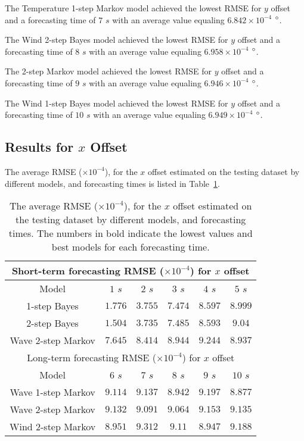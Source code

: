\documentclass[preprint,12pt]{elsarticle}
\begin{document}
The Temperature 1-step Markov model achieved the lowest RMSE for $y$ offset and a forecasting time of $7$ $s$ with an average value equaling $6.842 \times 10^{-4}$ $\degree$.

The Wind 2-step Bayes model achieved the lowest RMSE for $y$ offset and a forecasting time of $8$ $s$ with an average value equaling $6.958 \times 10^{-4}$ $\degree$.

The 2-step Markov model achieved the lowest RMSE for $y$ offset and a forecasting time of $9$ $s$ with an average value equaling $6.946 \times 10^{-4}$ $\degree$.

The Wind 1-step Bayes model achieved the lowest RMSE for $y$ offset and a forecasting time of $10$ $s$ with an average value equaling $6.949 \times 10^{-4}$ $\degree$.

\subsection{Results for $x$ Offset}

The average RMSE ($\times 10^{-4}$), for the $x$ offset estimated on the testing dataset by different models, and forecasting times is listed in Table~\ref{tab:best_longitude_RMSE}.

\begin{table}[!ht]
	\centering
	\begin{tabular}{|c|c|c|c|c|c|}
		\hline
		\multicolumn{6}{|c|}{Short-term forecasting RMSE ($\times 10^{-4}$) for $x$ offset} \\ \hline
		Model & $1$ $s$ & $2$ $s$ & $3$ $s$ & $4$ $s$ & $5$ $s$ \\ \hline
		1-step Bayes & $1.776$ & $3.755$ & $\mathbf{7.474}$ & $8.597$ & $8.999$ \\ \hline
		2-step Bayes & $\mathbf{1.504}$ & $\mathbf{3.735}$ & $7.485$ & $\mathbf{8.593}$ & $9.04$ \\ \hline
		Wave 2-step Markov & $7.645$ & $8.414$ & $8.944$ & $9.244$ & $\mathbf{8.937}$ \\ \hline
		\multicolumn{6}{|c|}{Long-term forecasting RMSE ($\times 10^{-4}$) for $x$ offset} \\ \hline
		Model & $6$ $s$ & $7$ $s$ & $8$ $s$ & $9$ $s$ & $10$ $s$ \\ \hline
		Wave 1-step Markov & $9.114$ & $9.137$ & $\mathbf{8.942}$ & $9.197$ & $\mathbf{8.877}$ \\ \hline
		Wave 2-step Markov & $9.132$ & $\mathbf{9.091}$ & $9.064$ & $9.153$ & $9.135$ \\ \hline
		Wind 2-step Markov & $\mathbf{8.951}$ & $9.312$ & $9.11$ & $\mathbf{8.947}$ & $9.188$ \\ \hline
	\end{tabular}
	\caption{The average RMSE ($\times 10^{-4}$), for the $x$ offset estimated on the testing dataset by different models, and forecasting times. The numbers in bold indicate the lowest values and best models for each forecasting time.}
	\label{tab:best_longitude_RMSE}
\end{table}
\end{document}
